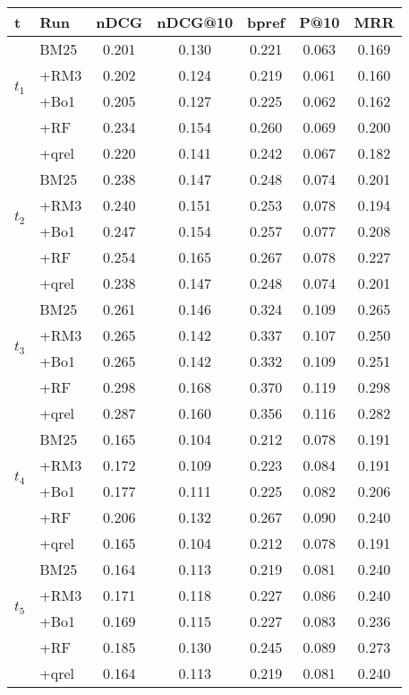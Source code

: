 \begin{tabular}{llccccc}
    \toprule
    t & Run & nDCG & nDCG@10 & bpref & P@10 & MRR \\
    \midrule
    \multirow[c]{4}{*}{$t_1$} & BM25 & 0.201 & 0.130 & 0.221 & 0.063 & 0.169 \\
     & +RM3 & 0.202 & 0.124 & 0.219 & 0.061 & 0.160 \\
     & +Bo1 & 0.205 & 0.127 & 0.225 & 0.062 & 0.162 \\
     & +RF & 0.234 & 0.154 & 0.260 & 0.069 & 0.200 \\
     & +qrel & 0.220 & 0.141 & 0.242 & 0.067 & 0.182 \\ \midrule

     \multirow[c]{4}{*}{$t_2$} & BM25 & 0.238 & 0.147 & 0.248 & 0.074 & 0.201 \\
      & +RM3 & 0.240 & 0.151 & 0.253 & 0.078 & 0.194 \\
      & +Bo1 & 0.247 & 0.154 & 0.257 & 0.077 & 0.208 \\
      & +RF & 0.254 & 0.165 & 0.267 & 0.078 & 0.227 \\
      & +qrel & 0.238 & 0.147 & 0.248 & 0.074 & 0.201 \\ \midrule

    \multirow[c]{4}{*}{$t_3$} & BM25 & 0.261 & 0.146 & 0.324 & 0.109 & 0.265 \\
      & +RM3 & 0.265 & 0.142 & 0.337 & 0.107 & 0.250 \\
      & +Bo1 & 0.265 & 0.142 & 0.332 & 0.109 & 0.251 \\
      & +RF & 0.298 & 0.168 & 0.370 & 0.119 & 0.298 \\
      & +qrel & 0.287 & 0.160 & 0.356 & 0.116 & 0.282 \\ \midrule

    \multirow[c]{4}{*}{$t_4$} & BM25 & 0.165 & 0.104 & 0.212 & 0.078 & 0.191 \\
      & +RM3 & 0.172 & 0.109 & 0.223 & 0.084 & 0.191 \\
      & +Bo1 & 0.177 & 0.111 & 0.225 & 0.082 & 0.206 \\
      & +RF & 0.206 & 0.132 & 0.267 & 0.090 & 0.240 \\
      & +qrel & 0.165 & 0.104 & 0.212 & 0.078 & 0.191 \\ \midrule

    \multirow[c]{4}{*}{$t_5$} & BM25 & 0.164 & 0.113 & 0.219 & 0.081 & 0.240 \\
      & +RM3 & 0.171 & 0.118 & 0.227 & 0.086 & 0.240 \\
      & +Bo1 & 0.169 & 0.115 & 0.227 & 0.083 & 0.236 \\
      & +RF & 0.185 & 0.130 & 0.245 & 0.089 & 0.273 \\
      & +qrel & 0.164 & 0.113 & 0.219 & 0.081 & 0.240 \\
    \bottomrule
\end{tabular}